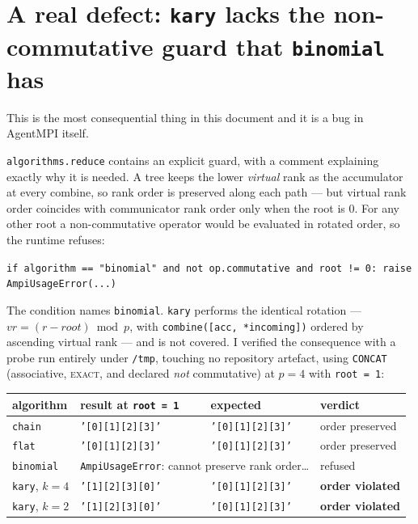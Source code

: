 \documentclass[11pt]{article}
\begin{document}
\section{A real defect: \texttt{kary} lacks the non-commutative guard that \texttt{binomial} has}

This is the most consequential thing in this document and it is a bug in AgentMPI itself.

\texttt{algorithms.reduce} contains an explicit guard, with a comment explaining exactly why it
is needed. A tree keeps the lower \emph{virtual} rank as the accumulator at every combine, so
rank order is preserved along each path --- but virtual rank order coincides with communicator
rank order only when the root is $0$. For any other root a non-commutative operator would be
evaluated in rotated order, so the runtime refuses:

\begin{center}\footnotesize
\texttt{if algorithm == "binomial" and not op.commutative and root != 0: raise AmpiUsageError(...)}
\end{center}

The condition names \texttt{binomial}. \texttt{kary} performs the identical rotation ---
$vr = (r - \mathit{root}) \bmod p$, with \texttt{combine([acc, *incoming])} ordered by
ascending virtual rank --- and is not covered. I verified the consequence with a probe run
entirely under \texttt{/tmp}, touching no repository artefact, using \texttt{CONCAT}
(associative, \textsc{exact}, and declared \emph{not} commutative) at $p=4$ with
\texttt{root = 1}:

\begin{center}\footnotesize
\begin{tabular}{@{}llll@{}}
\toprule
algorithm & result at \texttt{root = 1} & expected & verdict \\
\midrule
\texttt{chain} & \texttt{'[0][1][2][3]'} & \texttt{'[0][1][2][3]'} & order preserved \\
\texttt{flat} & \texttt{'[0][1][2][3]'} & \texttt{'[0][1][2][3]'} & order preserved \\
\texttt{binomial} & \multicolumn{2}{l}{\texttt{AmpiUsageError}: cannot preserve rank order\dots} & refused \\
\texttt{kary}, $k=4$ & \texttt{'[1][2][3][0]'} & \texttt{'[0][1][2][3]'} & \textbf{order violated} \\
\texttt{kary}, $k=2$ & \texttt{'[1][2][3][0]'} & \texttt{'[0][1][2][3]'} & \textbf{order violated} \\
\bottomrule
\end{tabular}
\end{center}
\end{document}
